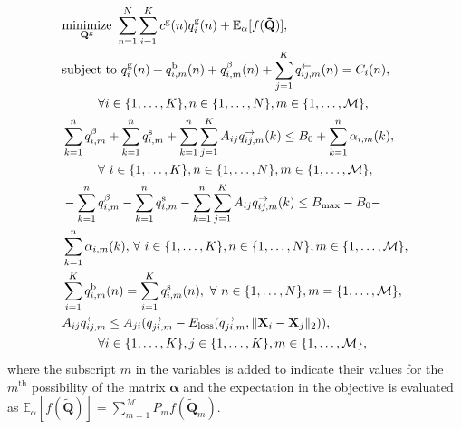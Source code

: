\documentclass[10pt, letter,twocolumn]{IEEEtran}
\begin{document}
\vspace{-0.0in}
\small
\begin{align}
&\underset{\mathbf{Q}^{\text{g}}}{\text{minimize}}\,\,\sum \limits_{n=1}^{N} \sum \limits_{i=1}^{K} c^{\text{g}}(n) q_{i}^{\text{g}}(n) + \mathbb{E}_{\alpha} [f(\mathbf{\tilde{Q}})] , \label{Obj5}\\
& \text{subject to}\,\,q_{i}^{\text{g}}(n) + q_{i,m}^{\text{b}}(n) + q_{i,m}^{\beta}(n) + \sum \limits^{K}_{j=1} q^{\leftarrow}_{ij,m}(n) = C_{i}(n), \notag \\
 & \hspace{1cm} \forall i \in \{1, \ldots, K \}, n \in \{1,\ldots,N\},  m \in \{ 1, \ldots, \mathcal{M}\}, \label{const51}\\
&\sum \limits_{k=1}^{n} q_{i,m}^{\beta} + \sum \limits_{k=1}^{n} q_{i,m}^{\text{s}} + \sum \limits_{k=1}^{n}  \sum \limits_{j=1}^{K} A_{ij} q^{\rightarrow}_{ij,m}(k) \leq B_{0} + \sum \limits_{k=1}^{n} \alpha_{i,m}(k), \notag \\
& \hspace{1cm} \forall \ i \in \{1,\ldots,K\}, n \in \{1, \ldots,N\}, m \in \{ 1, \ldots, \mathcal{M}\},  \label{const52}\\
&-\sum \limits_{k=1}^{n} q_{i,m}^{\beta} -  \sum \limits_{k=1}^{n} q_{i,m}^{\text{s}} - \sum \limits_{k=1}^{n}  \sum \limits_{j=1}^{K} A_{ij} q^{\rightarrow}_{ij,m}(k) \leq B_{\max}-B_{0} - \notag \\
& \hspace{0cm} \sum \limits_{k=1}^{n} \alpha_{i,m}(k), \, \forall \ i \in \{1,\ldots,K\}, n \in \{1, \ldots,N\}, m \in \{ 1, \ldots, \mathcal{M}\},\label{const53} \\
&\sum \limits_{i=1}^{K} q_{i,m}^{\text{b}}(n) = \sum \limits_{i=1}^{K} q_{i,m}^{\text{s}}(n), \ \forall \ n \in \{1,\ldots,N\}, m =\{1, \ldots, \mathcal{M}\},\label{const54}\ \\
&A_{ij}q^{\leftarrow}_{ij,m} \leq  A_{ji}(q^{\rightarrow}_{ji,m} -  E_{\text{loss}}(q^{\rightarrow}_{ji,m}, \|\mathbf{X}_{i} - \mathbf{X}_{j}\|_{2}) ), \notag \\
 & \hspace{1cm}\forall i \in \{1, \ldots,K\},j \in \{1,\ldots,K\}, m \in \{ 1, \ldots, \mathcal{M}\},\label{const55}
\end{align}\normalsize
where the subscript $m$ in the variables is added to indicate their values for the $m^{\text{th}}$ possibility of the matrix $\boldsymbol{\alpha}$ and the expectation in the objective is evaluated as $\mathbb{E}_{\alpha} [f(\mathbf{\tilde{Q}})] = \sum \limits_{m = 1}^{\mathcal{M}} P_{m} f(\mathbf{\tilde{Q}}_m)$.
\end{document}
